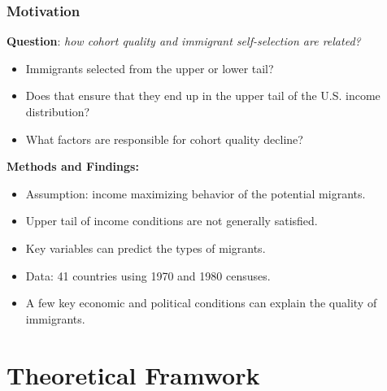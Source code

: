 \documentclass[10pt]{beamer}
\begin{document}
\begin{frame}[c]\frametitle{Motivation}
\textbf{Question}: \textit{how cohort quality and immigrant self-selection are related?}
\begin{itemize}
    \item Immigrants selected from the upper or lower tail?
    \item Does that ensure that they end up in the upper tail of the U.S. income distribution?
    \item What factors are responsible for cohort quality decline?
\end{itemize}

\textbf{Methods and Findings:}
\begin{itemize}
    \item Assumption: income maximizing behavior of the potential migrants.
    \item Upper tail of income conditions are not generally satisfied.
    \item Key variables can predict the types of migrants.
    \item Data: 41 countries using 1970 and 1980 censuses.
    \item A few key economic and political conditions can explain the quality of immigrants.
\end{itemize}

\end{frame}

\section{Theoretical Framwork}
\end{document}
